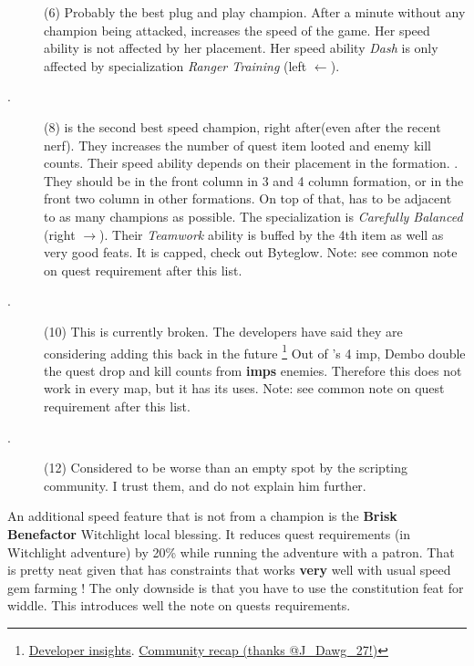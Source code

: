 \documentclass{article}
\begin{document}
\begin{description}
    \item[\shandie] (6) Probably the best plug and play champion.
    After a minute without any champion being attacked, \shandie increases the speed of the game.
    Her speed ability is not affected by her placement.
    Her speed ability \textit{Dash} is only affected by specialization \textit{Ranger Training} (left $\leftarrow$).
    
    \item[\hewmaan.] (8) \hewmaan is the second best speed champion, right after\briv (even after the recent nerf).
    They increases the number of quest item looted and enemy kill counts.
    Their speed ability depends on their placement in the formation.
    \hewmaan.
    They should be in the front column in 3 and 4 column formation, or in the front two column in other formations.
    On top of that, \hewmaan has to be adjacent to as many champions as possible.
    The specialization is \textit{Carefully Balanced} (right $\rightarrow$).
    Their \textit{Teamwork} ability is buffed by the 4th item as well as very good feats.
    It is capped, check out Byteglow.
    Note: see common note on quest requirement after this list.
    \item[\havilar.] (10) This is currently broken.
    The developers have said they are considering adding this back in the future \footnote{ \href{https://www.twitch.tv/videos/1538716891}{Developer insights}.
     \href{https://discord.com/channels/357247482247380994/357247483111276546/999801304639602718}{Community recap (thanks @J\_Dawg\_27!)}}
    Out of \havilar's 4 imp, Dembo double the quest drop and kill counts from \textbf{imps} enemies.
    Therefore this does not work in every map, but it has its uses.
    Note: see common note on quest requirement after this list.
    \item[\melf.] (12) Considered to be worse than an empty spot by the scripting community.
    I trust them, and do not explain him further.
\end{description}

An additional speed feature that is not from a champion is the \textbf{Brisk Benefactor} Witchlight local blessing.
It reduces quest requirements (in Witchlight adventure) by 20\% while running the adventure with a patron.
That is pretty neat given that \vjara has constraints that works \textbf{very} well with usual speed gem farming !
The only downside is that you have to use the constitution feat for widdle.
This introduces well the note on quests requirements.
\end{document}
